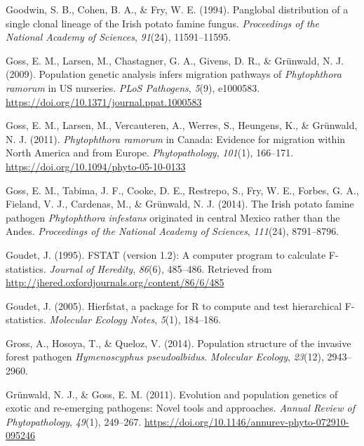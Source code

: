 \documentclass[double,11pt]{beavtex}
\begin{document}
  \hypertarget{ref-goodwin1994panglobal}{}
  Goodwin, S. B., Cohen, B. A., \& Fry, W. E. (1994). Panglobal
  distribution of a single clonal lineage of the Irish potato famine
  fungus. \emph{Proceedings of the National Academy of Sciences},
  \emph{91}(24), 11591--11595.
  
  \hypertarget{ref-goss2009population}{}
  Goss, E. M., Larsen, M., Chastagner, G. A., Givens, D. R., \& Grünwald,
  N. J. (2009). Population genetic analysis infers migration pathways of
  \emph{Phytophthora ramorum} in US nurseries. \emph{PLoS Pathogens},
  \emph{5}(9), e1000583.
  \url{https://doi.org/10.1371/journal.ppat.1000583}
  
  \hypertarget{ref-goss2011phytophthora}{}
  Goss, E. M., Larsen, M., Vercauteren, A., Werres, S., Heungens, K., \&
  Grünwald, N. J. (2011). \emph{Phytophthora ramorum} in Canada: Evidence
  for migration within North America and from Europe.
  \emph{Phytopathology}, \emph{101}(1), 166--171.
  \url{https://doi.org/10.1094/phyto-05-10-0133}
  
  \hypertarget{ref-goss2014irish}{}
  Goss, E. M., Tabima, J. F., Cooke, D. E., Restrepo, S., Fry, W. E.,
  Forbes, G. A., Fieland, V. J., Cardenas, M., \& Grünwald, N. J. (2014).
  The Irish potato famine pathogen \emph{Phytophthora infestans}
  originated in central Mexico rather than the Andes. \emph{Proceedings of
  the National Academy of Sciences}, \emph{111}(24), 8791--8796.
  
  \hypertarget{ref-goudet1995fstat}{}
  Goudet, J. (1995). FSTAT (version 1.2): A computer program to calculate
  F-statistics. \emph{Journal of Heredity}, \emph{86}(6), 485--486.
  Retrieved from \url{http://jhered.oxfordjournals.org/content/86/6/485}
  
  \hypertarget{ref-goudet2005hierfstat}{}
  Goudet, J. (2005). Hierfstat, a package for R to compute and test
  hierarchical F-statistics. \emph{Molecular Ecology Notes}, \emph{5}(1),
  184--186.
  
  \hypertarget{ref-gross2014population}{}
  Gross, A., Hosoya, T., \& Queloz, V. (2014). Population structure of the
  invasive forest pathogen \emph{Hymenoscyphus pseudoalbidus}.
  \emph{Molecular Ecology}, \emph{23}(12), 2943--2960.
  
  \hypertarget{ref-grunwald2011evolution}{}
  Grünwald, N. J., \& Goss, E. M. (2011). Evolution and population
  genetics of exotic and re-emerging pathogens: Novel tools and
  approaches. \emph{Annual Review of Phytopathology}, \emph{49}(1),
  249--267. \url{https://doi.org/10.1146/annurev-phyto-072910-095246}
  
\end{document}
